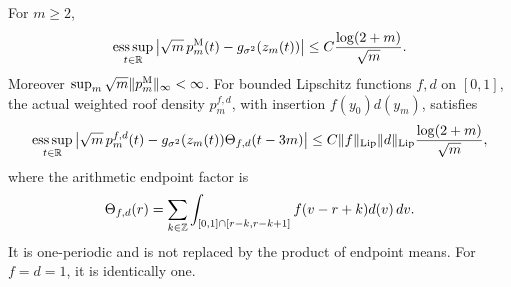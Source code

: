 \begin{theorem}
\label{thm:v59-markov-density}
For $m\ge2$,
\begin{equation}\label{eq:v59-pointwise-density}
 \operatorname*{ess\,sup}_{t\in\R}
 \left|\sqrt m\,p_m^{\rm M}(t)-g_{\sigma^2}(z_m(t))\right|
                         \le C\frac{\log(2+m)}{\sqrt m}.
\end{equation}
Moreover $\sup_m\sqrt m\|p_m^{\rm M}\|_\infty<\infty$.
For bounded Lipschitz functions $f,d$ on $[0,1]$, the actual weighted
roof density $p_m^{f,d}$, with insertion $f(y_0)d(y_m)$, satisfies
\begin{equation}\label{eq:v59-weighted-density}
 \operatorname*{ess\,sup}_{t\in\R}
 \left|\sqrt m\,p_m^{f,d}(t)
       -g_{\sigma^2}(z_m(t))\Theta_{f,d}(t-3m)\right|
       \le C\|f\|_{\rm Lip}\|d\|_{\rm Lip}
                            \frac{\log(2+m)}{\sqrt m},
\end{equation}
where the arithmetic endpoint factor is
\[
 \Theta_{f,d}(r)=\sum_{k\in\mathbb Z}\int_{[0,1]\cap[r-k,r-k+1]}
                       f(v-r+k)d(v)\,dv.
\]
It is one-periodic and is not replaced by the product of endpoint means.
For $f=d=1$, it is identically one.
\end{theorem}
